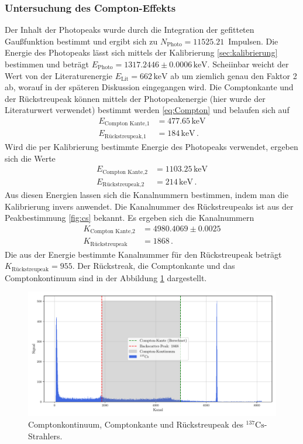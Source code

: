 \subsubsection{Untersuchung des Compton-Effekts}
Der Inhalt der Photopeaks wurde durch die Integration der gefitteten Gaußfunktion bestimmt und ergibt sich zu $N_\text{Photo} = 11525.21 \,$ Impulsen.
Die Energie des Photopeaks lässt sich mittels der Kalibrierung \ref{sec:kalibrierung} bestimmen 
und beträgt $E_\text{Photo} = 1317.2446 \pm 0.0006 \, \si{\kilo\electronvolt}$.
Scheiinbar weicht der Wert von der Literaturenergie $E_\text{Lit} = 662 \, \si{\kilo\electronvolt}$ ab um ziemlich genau den Faktor 2 ab, 
worauf in der späteren Diskussion eingegangen wird.
Die Comptonkante und der Rückstreupeak können mittels der Photopeakenergie (hier wurde der Literaturwert verwendet) bestimmt werden \ref{eq:Compton} und belaufen sich auf
\begin{align*}
  E_\text{Compton Kante,1} &= 477.65 \, \si{\kilo\electronvolt} \\
  E_\text{Rückstreupeak,1} &= 184 \, \si{\kilo\electronvolt} \, .
\end{align*}
Wird die per Kalibrierung bestimmte Energie des Photopeaks verwendet, ergeben sich die Werte
\begin{align*}
  E_\text{Compton Kante,2} &= 1103.25 \, \si{\kilo\electronvolt} \\
  E_\text{Rückstreupeak,2} &= 214 \, \si{\kilo\electronvolt} \, .
\end{align*}
Aus diesen Energien lassen sich die Kanalnummern bestimmen, indem man die Kalibrierung invers anwendet.
Die Kanalnummer des Rückstreupeaks ist aus der Peakbestimmung \ref{fig:cs} bekannt.
Es ergeben sich die Kanalnummern
\begin{align*}
  K_\text{Compton Kante,2} &= 4980.4069 \pm 0.0025 \\
  K_\text{Rückstreupeak} &= 1868 \, .
\end{align*}
Die aus der Energie bestimmte Kanalnummer für den Rückstreupeak beträgt $K_\text{Rückstreupeak} = 955$.
Der Rückstreak, die Comptonkante und das Comptonkontinuum sind in der Abbildung \ref{fig:compton} dargestellt.
\begin{figure}[H]
  \centering
  \includegraphics[width=\textwidth]{../plots/Caesium-Compton-Backscatter.pdf}
  \caption{Comptonkontinuum, Comptonkante und Rückstreupeak des $^{137}\text{Cs}$-Strahlers.}
  \label{fig:compton}
\end{figure}

